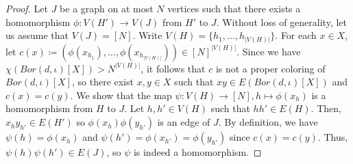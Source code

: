 \documentclass[10pt,a4paper]{amsart}
\begin{document}
\begin{proof}
    Let $J$ be a graph on at most $N$ vertices such that there exists a homomorphism $\phi : V(H') \to V(J)$ from $H'$ to $J$.
    Without loss of generality, let us assume that $V(J) = [N]$.
    Write $V(H) = \{h_1, \ldots, h_{|V(H)|}\}$.
    For each $x \in X$, let $c(x) \coloneqq (\phi(x_{h_1}), \ldots, \phi(x_{h_{|V(H)|}})) \in [N]^{|V(H)|}$.
    Since we have $\chi(Bor(d, \iota)[X]) > N^{|V(H)|}$, it follows that $c$ is not a proper coloring of $Bor(d, \iota)[X]$, so there exist $x, y \in X$ such that $xy \in E(Bor(d, \iota)[X])$ and $c(x) = c(y)$.
    We show that the map $\psi : V(H) \to [N], h \mapsto \phi(x_h)$ is a homomorphism from $H$ to $J$.
    Let $h, h' \in V(H)$ such that $hh' \in E(H)$.
    Then, $x_hy_{h'} \in E(H')$ so $\phi(x_h)\phi(y_{h'})$ is an edge of $J$.
    By definition, we have $\psi(h) = \phi(x_h)$ and $\psi(h') = \phi(x_{h'}) = \phi(y_{h'})$ since $c(x) = c(y)$.
    Thus, $\psi(h)\psi(h') \in E(J)$, so $\psi$ is indeed a homomorphism.
\end{proof}
\end{document}
